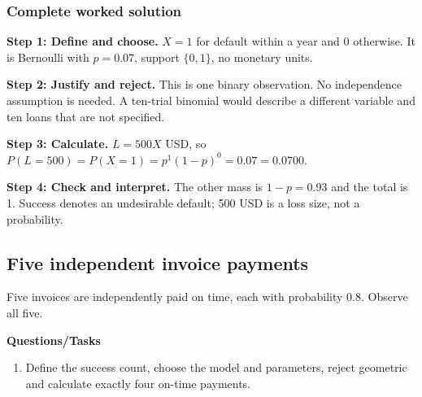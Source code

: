 \subsubsection*{Complete worked solution}
\par\noindent\begin{minipage}{\linewidth}
\textbf{Step 1: Define and choose.} $X=1$ for default within a year and 0 otherwise. It is Bernoulli with $p=0.07$, support $\{0,1\}$, no monetary units.
\end{minipage}\par\medskip
\par\noindent\begin{minipage}{\linewidth}
\textbf{Step 2: Justify and reject.} This is one binary observation. No independence assumption is needed. A ten-trial binomial would describe a different variable and ten loans that are not specified.
\end{minipage}\par\medskip
\par\noindent\begin{minipage}{\linewidth}
\textbf{Step 3: Calculate.} $L=500X$ USD, so $P(L=500)=P(X=1)=p^1(1-p)^0=0.07=0.0700$.
\end{minipage}\par\medskip
\par\noindent\begin{minipage}{\linewidth}
\textbf{Step 4: Check and interpret.} The other mass is $1-p=0.93$ and the total is 1. Success denotes an undesirable default; 500 USD is a loss size, not a probability.
\end{minipage}\par\medskip
{}
\subsection{Five independent invoice payments}
Five invoices are independently paid on time, each with probability 0.8. Observe all five.

\textbf{Questions/Tasks}
\begin{enumerate}
\item Define the success count, choose the model and parameters, reject geometric and calculate exactly four on-time payments.
\end{enumerate}
